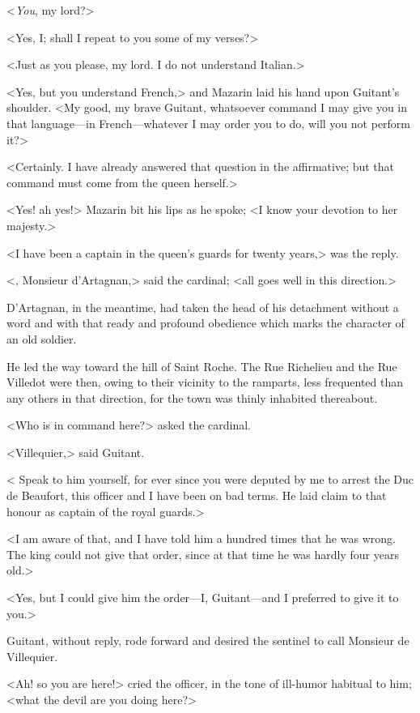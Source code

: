 <\emph{You}, my lord?>

<Yes, I; shall I repeat to you some of my verses?>

<Just as you please, my lord. I do not understand Italian.>

<Yes, but you understand French,> and Mazarin laid his hand upon Guitant's shoulder. <My good, my brave Guitant, whatsoever command I may give you in that language—in French—whatever I may order you to do, will you not perform it?>

<Certainly. I have already answered that question in the affirmative; but that command must come from the queen herself.>

<Yes! ah yes!> Mazarin bit his lips as he spoke; <I know your devotion to her majesty.>

<I have been a captain in the queen's guards for twenty years,> was the reply.

<, Monsieur d'Artagnan,> said the cardinal; <all goes well in this direction.>

D'Artagnan, in the meantime, had taken the head of his detachment without a word and with that ready and profound obedience which marks the character of an old soldier.

He led the way toward the hill of Saint Roche. The Rue Richelieu and the Rue Villedot were then, owing to their vicinity to the ramparts, less frequented than any others in that direction, for the town was thinly inhabited thereabout.

<Who is in command here?> asked the cardinal.

<Villequier,> said Guitant.

< Speak to him yourself, for ever since you were deputed by me to arrest the Duc de Beaufort, this officer and I have been on bad terms. He laid claim to that honour as captain of the royal guards.>

<I am aware of that, and I have told him a hundred times that he was wrong. The king could not give that order, since at that time he was hardly four years old.>

<Yes, but I could give him the order—I, Guitant—and I preferred to give it to you.>

Guitant, without reply, rode forward and desired the sentinel to call Monsieur de Villequier.

<Ah! so you are here!> cried the officer, in the tone of ill-humor habitual to him; <what the devil are you doing here?>

